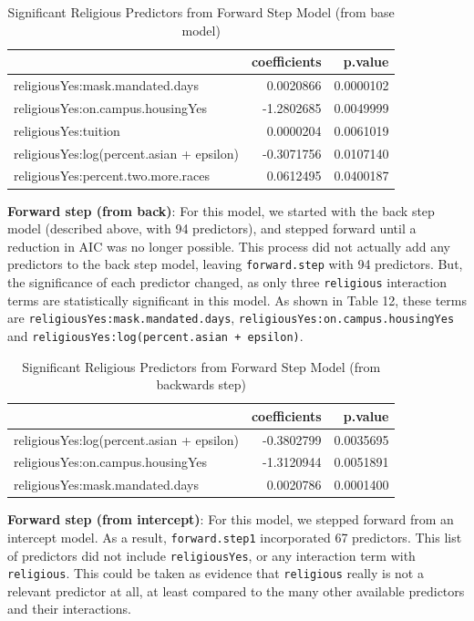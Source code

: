 \documentclass[
]{article}
\begin{document}
\begin{table}

\caption{\label{tab:unnamed-chunk-25}Significant Religious Predictors from Forward Step Model (from base model)}
\centering
\begin{tabular}[t]{l|r|r}
\hline
  & coefficients & p.value\\
\hline
religiousYes:mask.mandated.days & 0.0020866 & 0.0000102\\
\hline
religiousYes:on.campus.housingYes & -1.2802685 & 0.0049999\\
\hline
religiousYes:tuition & 0.0000204 & 0.0061019\\
\hline
religiousYes:log(percent.asian + epsilon) & -0.3071756 & 0.0107140\\
\hline
religiousYes:percent.two.more.races & 0.0612495 & 0.0400187\\
\hline
\end{tabular}
\end{table}

\textbf{Forward step (from back)}: For this model, we started with the
back step model (described above, with 94 predictors), and stepped
forward until a reduction in AIC was no longer possible. This process
did not actually add any predictors to the back step model, leaving
\texttt{forward.step} with 94 predictors. But, the significance of each
predictor changed, as only three \texttt{religious} interaction terms
are statistically significant in this model. As shown in Table 12, these
terms are \texttt{religiousYes:mask.mandated.days},
\texttt{religiousYes:on.campus.housingYes} and
\texttt{religiousYes:log(percent.asian\ +\ epsilon)}.

\begin{table}

\caption{\label{tab:unnamed-chunk-26}Significant Religious Predictors from Forward Step Model (from backwards step)}
\centering
\begin{tabular}[t]{l|r|r}
\hline
  & coefficients & p.value\\
\hline
religiousYes:log(percent.asian + epsilon) & -0.3802799 & 0.0035695\\
\hline
religiousYes:on.campus.housingYes & -1.3120944 & 0.0051891\\
\hline
religiousYes:mask.mandated.days & 0.0020786 & 0.0001400\\
\hline
\end{tabular}
\end{table}

\textbf{Forward step (from intercept)}: For this model, we stepped
forward from an intercept model. As a result, \texttt{forward.step1}
incorporated 67 predictors. This list of predictors did not include
\texttt{religiousYes}, or any interaction term with \texttt{religious}.
This could be taken as evidence that \texttt{religious} really is not a
relevant predictor at all, at least compared to the many other available
predictors and their interactions.
\end{document}
